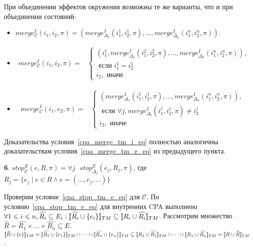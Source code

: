 При объединении эффектов окружения возможны те же варианты, что и при объединении состояний:
\begin{itemize}
\item 
$merge^I_{\mathscr{C}}(i_1,i_2,\pi) = (merge^I_{\Delta_1}(i_1^1, i_2^1,\pi), \dots, merge^I_{\Delta_n}(i_1^n, i_2^n,\pi))$.

\item
\begin{align}
merge^I_{\mathscr{C}}(i_1,i_2,\pi) =
& \begin{cases}
(i_1^1, merge^I_{\Delta_1}(i_1^2, i_2^2,\pi), \dots, merge^I_{\Delta_n}(i_1^n, i_2^n,\pi)),\\
\mbox{ если } i_1^1 = i_2^1 \\
i_2, \mbox{ иначе }
\end{cases} \nonumber
\end{align}

\item
\begin{align}
merge^I_{\mathscr{C}}(i_1,e_2,\pi) =
& \begin{cases}
(merge^I_{\Delta_1}(i_1^1, i_2^1,\pi), \dots, merge^I_{\Delta_n}(i_1^n, i_2^n,\pi)),\\
\mbox{ если } \forall j, merge^I_{\Delta_i}(i_1^j, i_2^j,\pi) \neq i_2^j \\
i_2, \mbox{ иначе }
\end{cases} \nonumber
\end{align}

\end{itemize}

Доказательства условия~\ref{cpa_merge_tm_i_eq} полностью аналогичны доказательствам условия~\ref{cpa_merge_tm_e_eq} из предыдущего пункта.

{\textbf 6.}
$stop^E_{\mathscr{C}}(e,R,\pi)=\forall j \mbox{ } stop^E_{\Delta_j}(e_j, R_j, \pi)$, где $R_j = \{e_j \mid e \in R \land e = (\dots, e_j, \dots)\}$

Проверим условие~\ref{cpa_stop_tm_e_eq} для $\mathscr{C}$.
По условию~\ref{cpa_stop_tm_e_eq} для внутренних CPA выполнено $\forall 1 \leqslant i \leqslant n, \widehat{R_i} \subseteq E_i: [\![ \widehat{R_i} \cup \{e_i\} ]\!]_{TM} \subseteq [\![ R_i \cup \widehat{R_i} ]\!]_{TM}$.
Рассмотрим множество $\widehat{R} = \widehat{R_1} \times \dots \times \widehat{R_n} \subseteq E$. 
$\conc{\widehat{R} \cup \{e\}}_{TM} = \conc{\widehat{R_1} \cup \{e_1\}}_{TM} \cap \dots \cap \conc{\widehat{R_n} \cup \{e_n\}}_{TM} \subseteq \conc{R_1 \cup \widehat{R_1}}_{TM} \cap \dots \cap \conc{R_n \cup \widehat{R_n}}_{TM} = \conc{R \cup \widehat{R}}_{TM}$.

